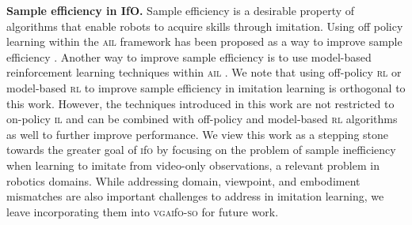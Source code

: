 \documentclass[letterpaper, 10 pt, conference]{ieeeconf}  %
\newcommand{\gaifo}{\textsc{gai}f\textsc{o}}
\newcommand{\ifo}{\textsc{i}f\textsc{o}}
\newcommand{\vgaifo}{\textsc{vgai}f\textsc{o}}
\newcommand{\vgaifoso}{\textsc{vgai}f\textsc{o}-\textsc{so}}
\newcommand{\rl}{\textsc{rl}}
\newcommand{\ail}{\textsc{ail}}
\newcommand{\il}{\textsc{il}}
\begin{document}
\textbf{Sample efficiency in IfO.} Sample efficiency is a desirable property of algorithms that enable robots to acquire skills through imitation. 
Using off policy learning within the \ail{} framework has been proposed as a way to improve sample efficiency \cite{opolo, valuedice, saifo}. Another way to improve sample efficiency is to use model-based reinforcement learning techniques within \ail{} \cite{dealio}. We note that using off-policy \rl{} or model-based \rl{} to improve sample efficiency in imitation learning is orthogonal to this work. However, the techniques introduced in this work are not restricted to on-policy \il{} and can be combined with off-policy and model-based \rl{} algorithms as well to further improve performance. We view this work as a stepping stone towards the greater goal of \ifo{} by focusing on the problem of sample inefficiency when learning to imitate from video-only observations, a relevant problem in robotics domains. While addressing domain, viewpoint, and embodiment mismatches are also important challenges to address in imitation learning, we leave incorporating them into \vgaifoso{} for future work.


\end{document}
